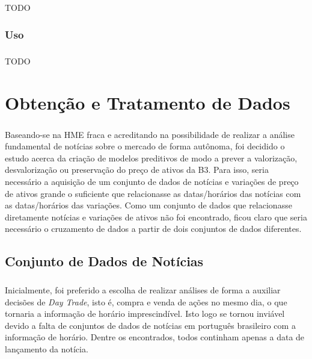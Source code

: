 \documentclass[grad,numbers]{coppe}
\begin{document}
  		\paragraph{}TODO
  	\subsection{Uso}
  		\paragraph{}TODO
  
  \chapter{Obtenção e Tratamento de Dados}
  	\paragraph{}Baseando-se na HME fraca e acreditando na possibilidade de realizar a análise fundamental de notícias sobre o mercado de forma autônoma, foi decidido o estudo acerca da criação de modelos preditivos de modo a prever a valorização, desvalorização ou preservação do preço de ativos da B3. Para isso, seria necessário a aquisição de um conjunto de dados de notícias e variações de preço de ativos grande o suficiente que relacionasse as datas/horários das notícias com as datas/horários das variações. Como um conjunto de dados que relacionasse diretamente notícias e variações de ativos não foi encontrado, ficou claro que seria necessário o cruzamento de dados a partir de dois conjuntos de dados diferentes.
  	\section{Conjunto de Dados de Notícias}
	  	\paragraph{}Inicialmente, foi preferido a escolha de realizar análises de forma a auxiliar decisões de \textit{Day Trade}, isto é, compra e venda de ações no mesmo dia, o que tornaria a informação de horário imprescindível. Isto logo se tornou inviável devido a falta de conjuntos de dados de notícias em português brasileiro com a informação de horário. Dentre os encontrados, todos continham apenas a data de lançamento da notícia.
\end{document}
